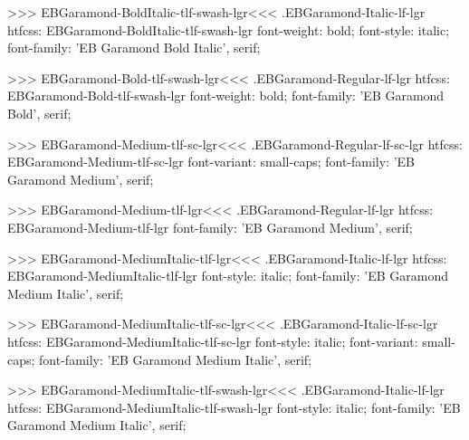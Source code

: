 >>>
\<EBGaramond-BoldItalic-tlf-swash-lgr\><<<
.EBGaramond-Italic-lf-lgr
htfcss:  EBGaramond-BoldItalic-tlf-swash-lgr  font-weight: bold; font-style: italic; font-family: 'EB Garamond Bold Italic', serif;

>>>
\<EBGaramond-Bold-tlf-swash-lgr\><<<
.EBGaramond-Regular-lf-lgr
htfcss:  EBGaramond-Bold-tlf-swash-lgr  font-weight: bold; font-family: 'EB Garamond Bold', serif;

>>>
\<EBGaramond-Medium-tlf-sc-lgr\><<<
.EBGaramond-Regular-lf-sc-lgr
htfcss:  EBGaramond-Medium-tlf-sc-lgr  font-variant: small-caps; font-family: 'EB Garamond Medium', serif;

>>>
\<EBGaramond-Medium-tlf-lgr\><<<
.EBGaramond-Regular-lf-lgr
htfcss:  EBGaramond-Medium-tlf-lgr  font-family: 'EB Garamond Medium', serif;

>>>
\<EBGaramond-MediumItalic-tlf-lgr\><<<
.EBGaramond-Italic-lf-lgr
htfcss:  EBGaramond-MediumItalic-tlf-lgr  font-style: italic; font-family: 'EB Garamond Medium Italic', serif;

>>>
\<EBGaramond-MediumItalic-tlf-sc-lgr\><<<
.EBGaramond-Italic-lf-sc-lgr
htfcss:  EBGaramond-MediumItalic-tlf-sc-lgr  font-style: italic; font-variant: small-caps; font-family: 'EB Garamond Medium Italic', serif;

>>>
\<EBGaramond-MediumItalic-tlf-swash-lgr\><<<
.EBGaramond-Italic-lf-lgr
htfcss:  EBGaramond-MediumItalic-tlf-swash-lgr  font-style: italic; font-family: 'EB Garamond Medium Italic', serif;

